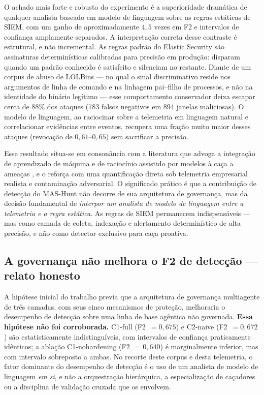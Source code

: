 O achado mais forte e robusto do experimento é a superioridade dramática de
qualquer analista baseado em modelo de linguagem sobre as regras estáticas de
SIEM, com um ganho de aproximadamente $4{,}5$ vezes em F2 e intervalos de
confiança amplamente separados. A interpretação correta desse contraste é
estrutural, e não incremental. As regras padrão do Elastic Security são
assinaturas determinísticas calibradas para precisão em produção: disparam quando
um padrão conhecido é satisfeito e silenciam no restante. Diante de um corpus de
abuso de LOLBins --- no qual o sinal discriminativo reside nos argumentos de
linha de comando e na linhagem pai--filho de processos, e não na identidade do
binário legítimo \cite{ucci2019} --- esse comportamento conservador deixa escapar
cerca de $88\%$ dos ataques (783 falsos negativos em 894 janelas maliciosas). O
modelo de linguagem, ao raciocinar sobre a telemetria em linguagem natural e
correlacionar evidências entre eventos, recupera uma fração muito maior desses
ataques (revocação de $0{,}61$--$0{,}65$) sem sacrificar a precisão.

Esse resultado situa-se em consonância com a literatura que advoga a integração
de aprendizado de máquina e de raciocínio assistido por modelos à caça a ameaças
\cite{ali2023huntgptintegratingmachinelearningbased}, e o reforça com uma
quantificação direta sob telemetria empresarial realista e contaminação
adversarial. O significado prático é que a contribuição de detecção do MAS-Hunt
não decorre de sua arquitetura de governança, mas da decisão fundamental de
\emph{interpor um analista de modelo de linguagem entre a telemetria e a regra
estática}. As regras de SIEM permanecem indispensáveis --- mas como camada de
coleta, indexação e alertamento determinístico de alta precisão, e não como
detector exclusivo para caça proativa.

\subsection{A governança não melhora o F2 de detecção --- relato honesto}
\label{subsec:disc-governanca-nula}

A hipótese inicial do trabalho previa que a arquitetura de governança multiagente
de três camadas, com seus cinco mecanismos de proteção, melhoraria o desempenho
de detecção sobre uma linha de base agêntica não governada. \textbf{Essa hipótese
não foi corroborada.} C1-full (F2~$=0{,}675$) e C2-naive (F2~$=0{,}672$) são
estatisticamente indistinguíveis, com intervalos de confiança praticamente
idênticos; a ablação C1-nohardening (F2~$=0{,}640$) é marginalmente inferior, mas
com intervalo sobreposto a ambas. No recorte deste corpus e desta telemetria, o
fator dominante do desempenho de detecção é o uso de um analista de modelo de
linguagem \emph{em si}, e não a orquestração hierárquica, a especialização de
caçadores ou a disciplina de validação cruzada que os envolvem.

